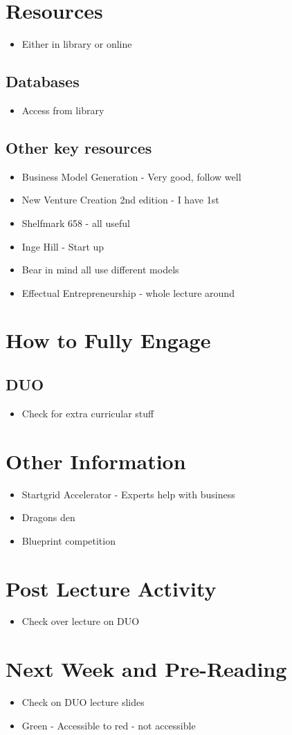 \documentclass{article}[18pt]
\begin{document}
\section{Resources}
\begin{itemize}
\item Either in library or online
\end{itemize}
\subsection{Databases}
\begin{itemize}
\item Access from library
\end{itemize}
\subsection{Other key resources}
\begin{itemize}
\item Business Model Generation - Very good, follow well
\item New Venture Creation 2nd edition  - I have 1st
\item Shelfmark 658 - all useful
\item Inge Hill - Start up
\item Bear in mind all use different models
\item Effectual Entrepreneurship - whole lecture around
\end{itemize}

\section{How to Fully Engage}

\subsection{DUO}
\begin{itemize}
\item Check for extra curricular stuff
\end{itemize}


\section{Other Information}
\begin{itemize}
\item Startgrid Accelerator  - Experts help with business
\item Dragons den
\item Blueprint competition
\end{itemize}

\section{Post Lecture Activity}
\begin{itemize}
\item Check over lecture on DUO
\end{itemize}
\section{Next Week and Pre-Reading}
\begin{itemize}
\item Check on DUO lecture slides
\item Green - Accessible to red - not accessible
\end{itemize}
\end{document}
